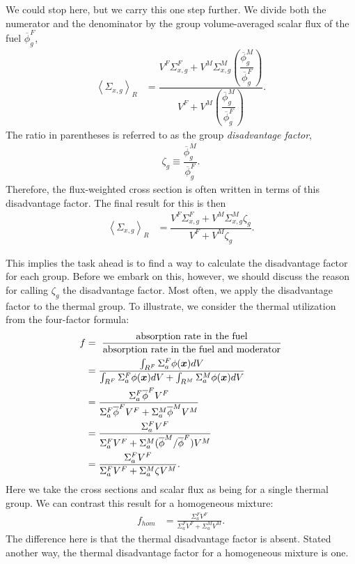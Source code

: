We could stop here, but we carry this one step further. We divide both the numerator and the denominator by the group volume-averaged scalar flux of the fuel $\overline{\phi}_g^F$,
\begin{align}
  \left< \Sigma_{x,g} \right>_R &= \dfrac{ V^F \Sigma_{x,g}^F  + V^M \Sigma_{x,g}^M \left( \dfrac{ \overline{\phi}_g^M }{ \overline{\phi}_g^F } \right) }{ V^F  + V^M \left( \dfrac{ \overline{\phi}_g^M }{ \overline{\phi}_g^F } \right) }. \nonumber
\end{align}
The ratio in parentheses is referred to as the group \emph{disadvantage factor},
\begin{align}
  \zeta_g \equiv \dfrac{ \overline{\phi}_g^M }{ \overline{\phi}_g^F } . \label{Eq:thermalization_disadvantageFactor}
\end{align}
Therefore, the flux-weighted cross section is often written in terms of this disadvantage factor. The final result for this is then
\begin{align}
  \left< \Sigma_{x,g} \right>_R &= \dfrac{ V^F \Sigma_{x,g}^F  + V^M \Sigma_{x,g}^M \zeta_g  }{ V^F  + V^M \zeta_g }.
\end{align}

This implies the task ahead is to find a way to calculate the disadvantage factor for each group. Before we embark on this, however, we should discuss the reason for calling $\zeta_g$ the disadvantage factor. Most often, we apply the disadvantage factor to the thermal group. To illustrate, we consider the thermal utilization from the four-factor formula:
\begin{align}
  f &= \ \frac{\text{absorption rate in the fuel}}{\text{absorption rate in the fuel and moderator}} \nonumber \\
    &= \frac{ \int_{R^F} \Sigma_a^F \phi(\bm{x}) dV }{ \int_{R^F} \Sigma_a^F \phi(\bm{x}) dV + \int_{R^M} \Sigma_a^M \phi(\bm{x}) dV } \nonumber \\
    &= \frac{ \Sigma_a^F \overline{\phi}^F V^F }{ \Sigma_a^F \overline{\phi}^F V^F + \Sigma_a^M \overline{\phi}^M V^M } \nonumber \\
    &= \frac{ \Sigma_a^F  V^F }{ \Sigma_a^F V^F + \Sigma_a^M ( \overline{\phi}^M / \overline{\phi}^F ) V^M } \nonumber \\
    &= \frac{ \Sigma_a^F  V^F }{ \Sigma_a^F V^F + \Sigma_a^M \zeta V^M } .
\end{align}
Here we take the cross sections and scalar flux as being for a single thermal group. We can contrast this result for a homogeneous mixture:
\begin{align}
  f_{hom} &=  \frac{ \Sigma_a^F  V^F }{ \Sigma_a^F V^F + \Sigma_a^M V^M } .
\end{align}
The difference here is that the thermal disadvantage factor is absent. Stated another way, the thermal disadvantage factor for a homogeneous mixture is one.

